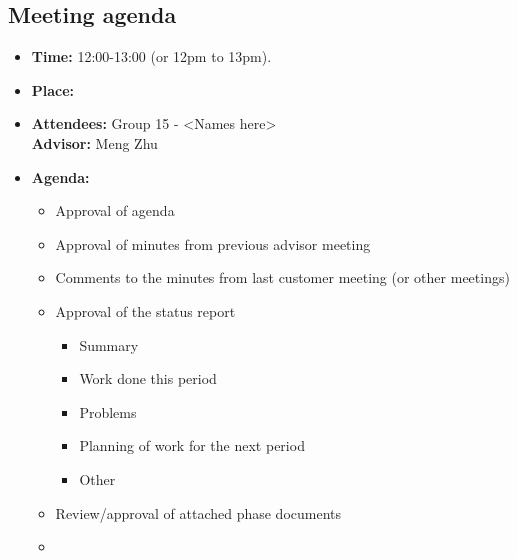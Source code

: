\subsection{Meeting agenda }
\begin{itemize}
\item \textbf{Time:} 12:00-13:00 (or 12pm to 13pm).
\item \textbf{Place:} \\
\item \textbf{Attendees:} Group 15 - <Names here> \\ \textbf{Advisor:} Meng Zhu
\item \textbf{Agenda:} 
	\begin{itemize}
	\item Approval of agenda
	\item Approval of minutes from previous advisor meeting
	\item Comments to the minutes from last customer meeting (or other meetings)
	\item Approval of the status report
		\begin{itemize}
		\item Summary
		\item Work done this period
		\item Problems
		\item Planning of work for the next period
		\item Other
	\end{itemize}
	\item Review/approval of attached phase documents
	\item <add other agenda items here>
	\end{itemize}
\end{itemize}
